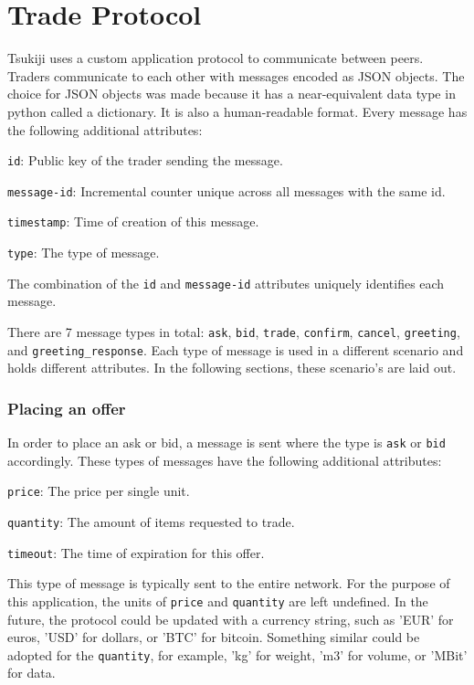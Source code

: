 \section{Trade Protocol}
\label{protocol}

Tsukiji uses a custom application protocol to communicate between peers.
Traders communicate to each other with messages encoded as JSON objects.
The choice for JSON objects was made because it has a near-equivalent data type in python called a dictionary.
It is also a human-readable format.
Every message has the following additional attributes:
\begin{myitemize}
\item \texttt{id}: Public key of the trader sending the message.
\item \texttt{message-id}: Incremental counter unique across all messages with the same id.
\item \texttt{timestamp}: Time of creation of this message.
\item \texttt{type}: The type of message.
\end{myitemize}
The combination of the \texttt{id} and \texttt{message-id} attributes uniquely identifies each message.

There are 7 message types in total: \texttt{ask}, \texttt{bid}, \texttt{trade}, \texttt{confirm}, \texttt{cancel}, \texttt{greeting}, and \texttt{greeting\_response}. Each type of message is used in a different scenario and holds different attributes. In the following sections, these scenario's are laid out.

\subsubsection{Placing an offer}
In order to place an ask or bid, a message is sent where the type is \texttt{ask} or \texttt{bid} accordingly.
These types of messages have the following additional attributes:
\begin{myitemize}
\item \texttt{price}: The price per single unit.
\item \texttt{quantity}: The amount of items requested to trade.
\item \texttt{timeout}: The time of expiration for this offer.
\end{myitemize}
This type of message is typically sent to the entire network.
For the purpose of this application, the units of \texttt{price} and \texttt{quantity} are left undefined.
In the future, the protocol could be updated with a currency string, such as 'EUR' for euros, 'USD' for dollars, or 'BTC' for bitcoin.
Something similar could be adopted for the \texttt{quantity}, for example, 'kg' for weight, 'm3' for volume, or 'MBit' for data.

